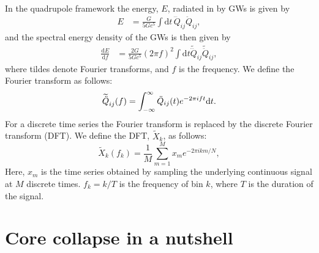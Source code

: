 In the quadrupole framework the energy, $E$, radiated in by GWs is given by 
\begin{align}
E &=\frac{G}{5 G c^5} \int \mathrm{d}t \, \dddot{Q}_{ij} \ddot{Q}_{ij},
\end{align}
and the spectral energy density of the GWs is then given by 
\begin{align}
\frac{\mathrm{d} E}{\mathrm{d} f} &= \frac{2G}{5 G c^5} (2\pi f)^2 \int \mathrm{d}t \widetilde{\dddot{Q}}_{ij} \widetilde{\ddot{Q}}_{ij},
\end{align}
where tildes denote Fourier transforms, and $f$ is the
frequency. We define the Fourier transform as follows:
\begin{equation}
\widetilde{\ddot{Q}}_{ij}(f) = \int_{-\infty}^{\infty} \ddot{Q}_{ij}(t) e^{-2 \pi i f t} \mathrm{d} t. 
\end{equation}
For a discrete time series the Fourier transform is replaced by the discrete Fourier transform (DFT).
We define the DFT, $\widetilde{X}_k$, as follows: 
\begin{equation} \label{eq:DFT}
\widetilde{X}_k (f_k) = \frac{1}{M}  \sum^M_{m=1} x_m e^{-2\pi i k m/N},
\end{equation}
Here, $x_m$ is the time series obtained by sampling the underlying continuous signal at $M$ discrete times. 
$f_k = k/T$ is the frequency of bin $k$, where $T$ is the duration of the signal.

\section{Core collapse in a nutshell}